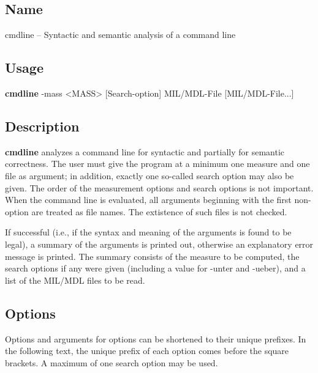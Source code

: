 %
%

\subsection*{Name}
cmdline -- Syntactic and semantic analysis of a command line

\subsection*{Usage}
{\bf cmdline} -mass <MASS> [Search-option] MIL/MDL-File [MIL/MDL-File...]

\subsection*{Description}
{\bf cmdline} analyzes a command line for syntactic and partially for
semantic correctness.
The user must give the program at a minimum one measure and one file
as argument; in addition, exactly one so-called search option may also
be given. 
The order of the measurement options and search options is not
important. 
When the command line is evaluated, all arguments beginning with the
first non-option are treated as file names.  The extistence of such
files is not checked.

If successful (i.e., if the syntax and meaning of the arguments is
found to be legal), a summary of the arguments is printed out,
otherwise an explanatory error message is printed.
The summary consists of the measure to be computed, the search options
if any were given (including a value for -unter and -ueber), and a
list of the MIL/MDL files to be read.

\subsection*{Options}
Options and arguments for options can be shortened to their unique
prefixes.
In the following text, the unique prefix of each option comes before
the square brackets.
A maximum of one search option may be used.

